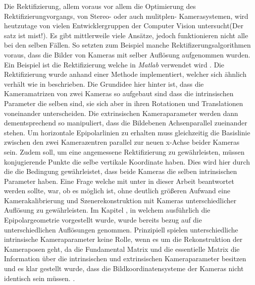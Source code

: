 Die Rektifizierung, allem voraus vor allem die Optimierung des Rektifizierungvorgangs, von Stereo- oder auch mulitplen- Kamerasystemen, wird heutzutage von vielen Entwicklergruppen der Computer Vision untersucht(Der satz ist mist!). Es gibt mittlerweile viele Ansätze, jedoch funktionieren nicht alle bei den selben Fällen. So setzten zum Beispiel manche Rektifizerungsalgorithmen voraus, dass die Bilder von Kameras mit selber Auflösung aufgenommen wurden. Ein Beispiel ist die Rektifizierung welche in \textit{Matlab} verwendet wird \cite{MatlabRec}. Die Rektifizierung wurde anhand einer Methode implementiert, welcher sich ähnlich verhält wie in \cite{FusielloSite} beschrieben. Die Grundidee hier hinter ist, dass die Kameramatrizen von zwei Kameras so aufgebaut sind dass die intrinsischen Parameter die selben sind, sie sich aber in ihren Rotationen und Translationen voneinander unterscheiden. Die extrinsischen Kameraparameter werden dann dementsprechend so manipuliert, dass die Bildebenen Achsenparallel zueinander stehen\cite{FusielloSite,Fusiello}. Um horizontale Epipolarlinien zu erhalten muss gleichzeitig die Basislinie zwischen den zwei Kamerazentren parallel zur neuen x-Achse beider Kameras sein. Zudem soll, um eine angemessene Rektifizierung zu gewährleisten, müssen konjugierende Punkte die selbe vertikale Koordinate haben. Dies wird hier durch die die Bedingung gewährleistet, dass beide Kameras die selben intrinsischen Parameter haben\cite{FusielloSite}. Eine Frage welche mit unter in dieser Arbeit beantwortet werden sollte, war, ob es möglich ist, ohne deutlich größeren Aufwand eine Kamerakalibrierung und Szenerekonstruktion mit Kameras unterschiedlicher Auflösung zu gewährleisten. Im Kapitel , in welchem ausführlich die Epipolargeometrie vorgestellt wurde, wurde bereits bezug auf die unterschiedlichen Auflösungen genommen. Prinzipiell spielen unterschiedliche intrinsische Kameraparameter keine Rolle, wenn es um die Rekonstruktion der Kameraposen geht, da die Fundamental Matrix und die essentielle Matrix die Information über die intrinsischen und extrinsischen Kameraparameter besitzen und es klar gestellt wurde, dass die Bildkoordinatensysteme der Kameras nicht identisch sein müssen. \cite{Elements}. \\




